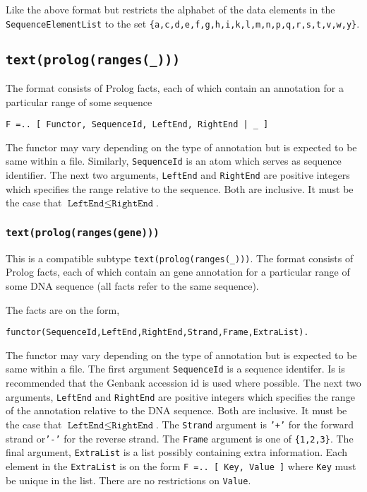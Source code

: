 \documentclass{book}
\begin{document}
Like the above format but restricts the alphabet of the data elements
in the \texttt{SequenceElementList} to the set
\texttt{\{a,c,d,e,f,g,h,i,k,l,m,n,p,q,r,s,t,v,w,y\}}.

\subsection{\texttt{text(prolog(ranges(\_)))}} 

The format consists of Prolog facts, each of which contain an
annotation for a particular range of some sequence

\begin{verbatim}
F =.. [ Functor, SequenceId, LeftEnd, RightEnd | _ ]
\end{verbatim}

The functor may vary depending on the type of annotation but is
expected to be same within a file. Similarly, \texttt{SequenceId} is an atom
which serves as sequence identifier. The next two arguments,
\texttt{LeftEnd} and \texttt{RightEnd} are positive integers which specifies 
the range relative to the sequence. Both are inclusive.  It must be
the case that $\texttt{LeftEnd} \le \texttt{RightEnd}$. 

\subsubsection{\texttt{text(prolog(ranges(gene)))}} 

This is a compatible subtype \texttt{text(prolog(ranges(\_)))}.
The format consists of Prolog facts, each of which contain an
gene annotation for a particular range of some DNA sequence
 (all facts refer to the same sequence).

The facts are on the form, 
\begin{verbatim}
functor(SequenceId,LeftEnd,RightEnd,Strand,Frame,ExtraList).
\end{verbatim}

The functor may vary depending on the type of annotation but is
expected to be same within a file. The first argument
\texttt{SequenceId} is a sequence identifer. Is is recommended that 
the Genbank accession id is used where possible.
The next two arguments,
\texttt{LeftEnd} and \texttt{RightEnd} are positive integers which specifies 
the range of the annotation relative to the DNA sequence. 
Both are inclusive.  It must be
the case that $\texttt{LeftEnd} \le \texttt{RightEnd}$. 
The
\texttt{Strand} argument is \texttt{'+'} for the forward strand
or\texttt{'-'} for the reverse strand. The \texttt{Frame} argument
is one of \texttt{\{1,2,3\}}. The final argument, \texttt{ExtraList}
is a list possibly containing extra information. Each element in the 
\texttt{ExtraList} is on the form \texttt{F =.. [ Key, Value ]} where
\texttt{Key} must be unique in the list. There are no restrictions on \texttt{Value}.
\end{document}
